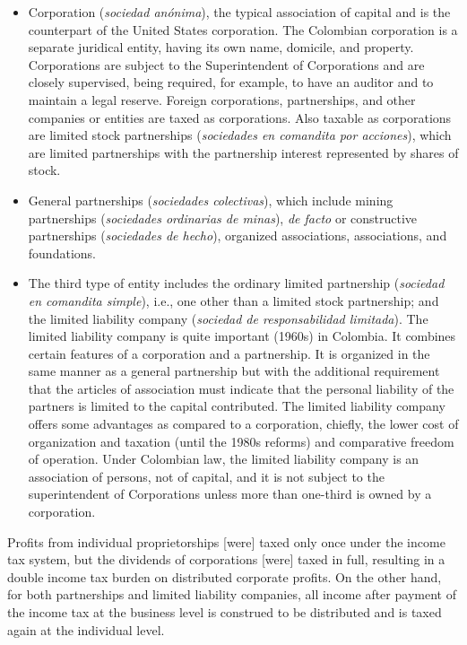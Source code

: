 \documentclass[
  12pt]{article}
\theoremstyle{definition}
\theoremstyle{remark}
\begin{document}
\begin{itemize}
\item
  Corporation (\emph{sociedad anónima}), the typical association of
  capital and is the counterpart of the United States corporation. The
  Colombian corporation is a separate juridical entity, having its own
  name, domicile, and property. Corporations are subject to the
  Superintendent of Corporations and are closely supervised, being
  required, for example, to have an auditor and to maintain a legal
  reserve. Foreign corporations, partnerships, and other companies or
  entities are taxed as corporations. Also taxable as corporations are
  limited stock partnerships (\emph{sociedades en comandita por
  acciones}), which are limited partnerships with the partnership
  interest represented by shares of stock.
\item
  General partnerships (\emph{sociedades colectivas}), which include
  mining partnerships (\emph{sociedades ordinarias de minas}), \emph{de
  facto} or constructive partnerships (\emph{sociedades de hecho}),
  organized associations, associations, and foundations.
\item
  The third type of entity includes the ordinary limited partnership
  (\emph{sociedad en comandita simple}), i.e., one other than a limited
  stock partnership; and the limited liability company (\emph{sociedad
  de responsabilidad limitada}). The limited liability company is quite
  important (1960s) in Colombia. It combines certain features of a
  corporation and a partnership. It is organized in the same manner as a
  general partnership but with the additional requirement that the
  articles of association must indicate that the personal liability of
  the partners is limited to the capital contributed. The limited
  liability company offers some advantages as compared to a corporation,
  chiefly, the lower cost of organization and taxation (until the 1980s
  reforms) and comparative freedom of operation. Under Colombian law,
  the limited liability company is an association of persons, not of
  capital, and it is not subject to the superintendent of Corporations
  unless more than one-third is owned by a corporation.
\end{itemize}

Profits from individual proprietorships {[}were{]} taxed only once under
the income tax system, but the dividends of corporations {[}were{]}
taxed in full, resulting in a double income tax burden on distributed
corporate profits. On the other hand, for both partnerships and limited
liability companies, all income after payment of the income tax at the
business level is construed to be distributed and is taxed again at the
individual level.
\end{document}
